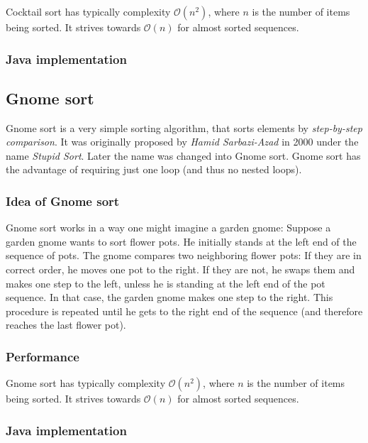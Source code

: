 \documentclass[nobranding]{pfBook}
\newcommand{\OO}{\mathcal{O}}
\begin{document}
	Cocktail sort has typically complexity $\OO(n^2)$, where $n$ is the number of items being sorted. It strives towards $\OO(n)$ for almost sorted sequences.
	
	\subsubsection{Java implementation}
	
	
	
	\subsection{Gnome sort}
	
	Gnome sort is a very simple sorting algorithm, that sorts elements by \emph{step-by-step comparison}. It was originally proposed by \emph{Hamid Sarbazi-Azad} in 2000 under the name \emph{Stupid Sort}. Later the name was changed into Gnome sort. Gnome sort has the advantage of requiring just one loop (and thus no nested loops).
	
	\subsubsection{Idea of Gnome sort}
	
	Gnome sort works in a way one might imagine a garden gnome: Suppose a garden gnome wants to sort flower pots. He initially stands at the left end of the sequence of pots. The gnome compares two neighboring flower pots: If they are in correct order, he moves one pot to the right. If they are not, he swaps them and makes one step to the left, unless he is standing at the left end of the pot sequence. In that case, the garden gnome makes one step to the right. This procedure is repeated until he gets to the right end of the sequence (and therefore reaches the last flower pot).
	
	\subsubsection{Performance}
	
	Gnome sort has typically complexity $\OO(n^2)$, where $n$ is the number of items being sorted. It strives towards $\OO(n)$ for almost sorted sequences.
	
	\subsubsection{Java implementation}
	
\end{document}
